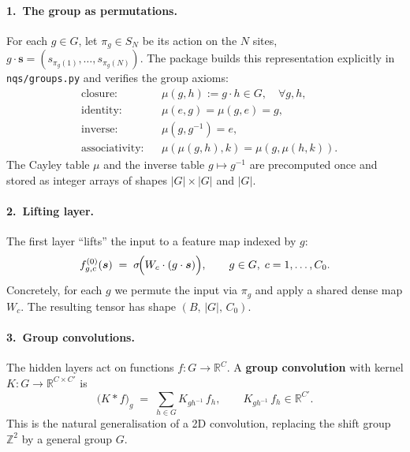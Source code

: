 \documentclass[11pt,a4paper]{article}
\newcommand{\R}{\mathbb{R}}
\newcommand{\Z}{\mathbb{Z}}
\newcommand{\bs}{\bm{s}}
\theoremstyle{definition}
\theoremstyle{plain}
\begin{document}
\paragraph{1.\ The group as permutations.}
For each $g \in G$, let $\pi_{g} \in S_{N}$ be its action on the $N$ sites,
$g\cdot\bs = (s_{\pi_{g}(1)}, \dots, s_{\pi_{g}(N)})$. The package builds
this representation explicitly in \texttt{nqs/groups.py} and verifies the
group axioms:
\begin{align}
   &\text{closure:}    && \mu(g, h) := g\cdot h \in G, \quad \forall g,h, \\
   &\text{identity:}   && \mu(e, g) = \mu(g, e) = g, \\
   &\text{inverse:}    && \mu(g, g^{-1}) = e, \\
   &\text{associativity:} && \mu(\mu(g,h), k) = \mu(g, \mu(h, k)).
\end{align}
The Cayley table $\mu$ and the inverse table $g \mapsto g^{-1}$ are
precomputed once and stored as integer arrays of shapes $|G|\times|G|$ and
$|G|$.

\paragraph{2.\ Lifting layer.}
The first layer ``lifts'' the input to a feature map indexed by $g$:
\begin{equation}
   f^{(0)}_{g, c}(\bs) \;=\; \sigma\!\Bigl( W_{c}\cdot (g\cdot\bs) \Bigr),
   \qquad g\in G,\; c=1,\dots,C_{0}.
\end{equation}
Concretely, for each $g$ we permute the input via $\pi_{g}$ and apply a
shared dense map $W_{c}$. The resulting tensor has shape
$(B,\,|G|,\,C_{0})$.

\paragraph{3.\ Group convolutions.}
The hidden layers act on functions $f : G \to \R^{C}$. A
\textbf{group convolution} with kernel $K : G \to \R^{C\times C'}$ is
\begin{equation}
   \bigl(K * f\bigr)_{g}
   \;=\; \sum_{h\in G} K_{g h^{-1}}\, f_{h},
   \qquad
   K_{g h^{-1}}\, f_{h} \in \R^{C'}.
\label{eq:gconv}
\end{equation}
This is the natural generalisation of a 2D convolution, replacing the
shift group $\Z^{2}$ by a general group $G$.
\end{document}
